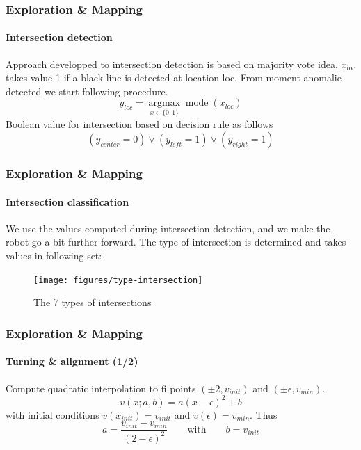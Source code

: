 \documentclass[10pt]{beamer}
\begin{document}

\begin{frame}
\frametitle{Exploration \& Mapping}
\framesubtitle{Intersection detection}
Approach developped to intersection detection is based on majority vote idea. $x_{loc}$ takes value 1 if a black line is detected at location loc. From moment anomalie detected we start following procedure.
$$
y_{loc} = \underset{x \in  \{0,1\}}{\operatorname{argmax}} \operatorname{mode}(x_{loc})
$$
Boolean value for intersection based on decision rule as follows
$$
(y_{center} = 0) \lor (y_{left} = 1) \lor (y_{right} = 1) 
$$
\end{frame}


\begin{frame}
\frametitle{Exploration \& Mapping}
\framesubtitle{Intersection classification}
We use the values computed during intersection detection, and we make the robot go a bit further forward. The type of intersection is determined and takes values in following set:
\begin{figure}[hbtp]
\centering
\label{fig:type-intersection}
\texttt{[image: figures/type-intersection]}
\caption{The 7 types of intersections}
\end{figure}
\end{frame}


\begin{frame}[label={frame:align}]
\frametitle{Exploration \& Mapping}
\framesubtitle{Turning \& alignment (1/2)}
Compute quadratic interpolation to fi points $(\pm2,v_{init})$ and $(\pm\epsilon,v_{min})$.
$$
v(x;a,b) = a(x-\epsilon)^2+b 
$$
with initial conditions $v(x_{init}) = v_{init}$ and $v(\epsilon) = v_{min}$. Thus
$$
a = \frac{v_{init}-v_{min}}{(2-\epsilon)^2}
\qquad\text{with}\qquad
b = v_{init}
$$
\end{frame}
\end{document}

